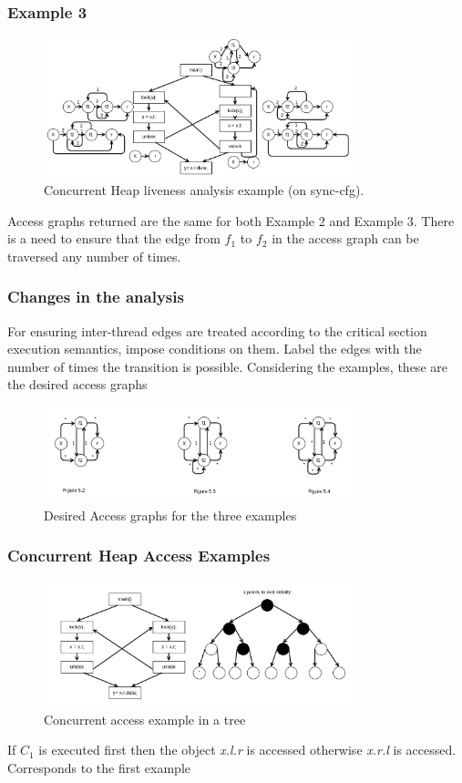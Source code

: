 \documentclass{beamer}
\begin{document}
\begin{frame}
	\frametitle{Example 3}
	\begin{figure}
		\centering
		\includegraphics[width=0.8\textwidth]{Figures/rsz_loop_outside.png}
		\caption{Concurrent Heap liveness analysis example (on sync-cfg).}
		\label{fig:threadidanalysis}
	\end{figure}
	Access graphs returned are the same for both Example 2 and Example 3. There is a need to ensure that the edge from $f_1$ to $f_2$ in the access graph can be traversed any number of times. 
\end{frame}

\begin{frame}
	\frametitle{Changes in the analysis}
 	For ensuring inter-thread edges are treated according to the critical section execution semantics, impose conditions on them. 
 	Label the edges with the number of times the transition is possible. Considering the examples, these are the desired access graphs
 	\begin{figure}
 		\centering
 		\includegraphics[width=0.8\textwidth]{Figures/access_graph_rep.png}
 		\caption{Desired Access graphs for the three examples}
 		\label{fig:ch5example}
 	\end{figure}
\end{frame}

\begin{frame}
	\frametitle{Concurrent Heap Access Examples}
	\begin{figure}
		\centering
		\includegraphics[width=0.8\textwidth]{Figures/tree1.png}
		\caption{Concurrent access example in a tree}
		\label{fig:ch5example}
	\end{figure}
	If $C_1$ is executed first then the object \emph{x.l.r} is accessed otherwise \emph{x.r.l} is accessed. Corresponds to the first example
\end{frame}
\end{document}
